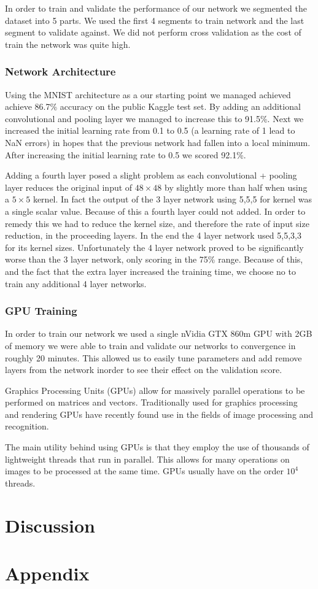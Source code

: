 \documentclass[10pt,twocolumn]{article}
\begin{document}
In order to train and validate the performance of our network we segmented the dataset into 5 parts. We used the first 4 segments to train network and the last segment to validate against. We did not perform cross validation as the cost of train the network was quite high. 
\subsubsection{Network Architecture}
Using the MNIST architecture as a our starting point we managed achieved achieve 86.7\% accuracy on the public Kaggle test set. By adding an additional convolutional and pooling layer we managed to increase this to 91.5\%. Next we increased the initial learning rate from 0.1 to 0.5 (a learning rate of 1 lead to NaN errors) in hopes that the previous network had fallen into a local minimum. After increasing the initial learning rate to 0.5 we scored 92.1\%. 

Adding a fourth layer posed a slight problem as each convolutional + pooling layer reduces the original input of $48 \times 48$ by slightly more than half when using a $5 \times 5$ kernel. In fact the output of the 3 layer network using 5,5,5 for kernel was a single scalar value. Because of this a fourth layer could not added. In order to remedy this we had to reduce the kernel size, and therefore the rate of input size reduction, in the proceeding layers. In the end the 4 layer network used 5,5,3,3 for its kernel sizes. Unfortunately the 4 layer network proved to be significantly worse than the 3 layer network, only scoring in the 75\% range. Because of this, and the fact that the extra layer increased the training time, we choose no to train any additional 4 layer networks.
 
\subsubsection{GPU Training}
In order to train our network we used a single nVidia GTX 860m GPU with 2GB of memory we were able to train and validate our networks to convergence in roughly 20 minutes. This allowed us to easily tune parameters and add remove layers from the network inorder to see their effect on the validation score.

Graphics Processing Units (GPUs) allow for massively parallel operations to be performed on matrices and vectors. Traditionally used for graphics processing and rendering GPUs have recently found use in the fields of image processing and recognition. 

The main utility behind using GPUs is that they employ the use of thousands of lightweight threads that run in parallel. This allows for many operations on images to be processed at the same time. GPUs usually have on the order $10^4$ threads.

\section{Discussion}


\section*{Appendix}
\end{document}
